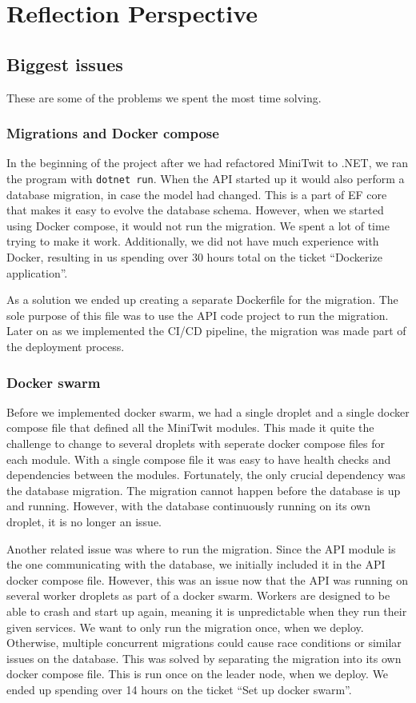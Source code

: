 \section{Reflection Perspective}

\subsection{Biggest issues}

These are some of the problems we spent the most time solving.

\subsubsection{Migrations and Docker compose}

In the beginning of the project after we had refactored MiniTwit to .NET,
we ran the program with \texttt{dotnet run}. 
When the API started up it would also perform a database migration,
in case the model had changed. This is a part of EF core
that makes it easy to evolve the database schema.
However, when we started using Docker compose, it would not run the migration.
We spent a lot of time trying to make it work.
Additionally, we did not have much experience with Docker,
resulting in us spending over 30 hours total on the ticket
``Dockerize application''.

As a solution we ended up creating a separate Dockerfile for the migration.
The sole purpose of this file was to use the API code project to run the migration.
Later on as we implemented the CI/CD pipeline, 
the migration was made part of the deployment process.

\subsubsection{Docker swarm}

Before we implemented docker swarm, we had a single droplet 
and a single docker compose file that defined all the MiniTwit modules.
This made it quite the challenge to change to several droplets with 
seperate docker compose files for each module.
With a single compose file it was easy to have health checks and
dependencies between the modules. 
Fortunately, the only crucial dependency was the database migration.
The migration cannot happen before the database is up and running.
However, with the database continuously running on its own droplet,
it is no longer an issue.

Another related issue was where to run the migration.
Since the API module is the one communicating with the database,
we initially included it in the API docker compose file.
However, this was an issue now that the API was running on several 
worker droplets as part of a docker swarm. Workers are designed
to be able to crash and start up again, 
meaning it is unpredictable when they run their given services.
We want to only run the migration once, when we deploy.
Otherwise, multiple concurrent migrations could cause 
race conditions or similar issues on the database.
This was solved by separating the migration into its own docker compose file.
This is run once on the leader node, when we deploy.
We ended up spending over 14 hours on the ticket ``Set up docker swarm''.

